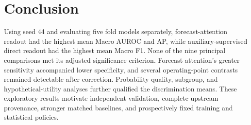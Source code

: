 \section{Conclusion}
Using seed 44 and evaluating five fold models separately, forecast-attention readout had the highest mean Macro AUROC and AP, while auxiliary-supervised direct readout had the highest mean Macro F1. None of the nine principal comparisons met its adjusted significance criterion. Forecast attention's greater sensitivity accompanied lower specificity, and several operating-point contrasts remained detectable after correction. Probability-quality, subgroup, and hypothetical-utility analyses further qualified the discrimination means. These exploratory results motivate independent validation, complete upstream provenance, stronger matched baselines, and prospectively fixed training and statistical policies.
